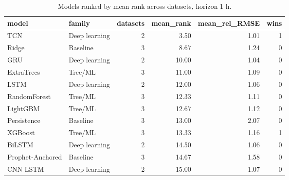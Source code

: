 \begin{table}
\caption{Models ranked by mean rank across datasets, horizon 1 h.}
\label{tab:cross1}
\begin{tabular}{llrrrr}
\toprule
model & family & datasets & mean_rank & mean_rel_RMSE & wins \\
\midrule
TCN & Deep learning & 2 & 3.50 & 1.01 & 1 \\
Ridge & Baseline & 3 & 8.67 & 1.24 & 0 \\
GRU & Deep learning & 2 & 10.00 & 1.04 & 0 \\
ExtraTrees & Tree/ML & 3 & 11.00 & 1.09 & 0 \\
LSTM & Deep learning & 2 & 12.00 & 1.06 & 0 \\
RandomForest & Tree/ML & 3 & 12.33 & 1.11 & 0 \\
LightGBM & Tree/ML & 3 & 12.67 & 1.12 & 0 \\
Persistence & Baseline & 3 & 13.00 & 2.07 & 0 \\
XGBoost & Tree/ML & 3 & 13.33 & 1.16 & 1 \\
BiLSTM & Deep learning & 2 & 14.50 & 1.06 & 0 \\
Prophet-Anchored & Baseline & 3 & 14.67 & 1.58 & 0 \\
CNN-LSTM & Deep learning & 2 & 15.00 & 1.07 & 0 \\
\bottomrule
\end{tabular}
\end{table}
